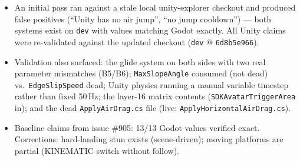 \documentclass[11pt]{article}
\newcommand{\code}[1]{\texttt{\small #1}}
\begin{document}
\begin{itemize}[leftmargin=1.4em]
  \item An initial pass ran against a stale local unity-explorer checkout and produced
        false positives (``Unity has no air jump'', ``no jump cooldown'') --- both
        systems exist on \code{dev} with values matching Godot exactly. All Unity
        claims were re-validated against the updated checkout (\code{dev} @
        \code{6d8b5e966}).
  \item Validation also surfaced: the glide system on both sides with two real
        parameter mismatches (B5/B6); \code{MaxSlopeAngle} consumed (not dead) vs.\
        \code{EdgeSlipSpeed} dead; Unity physics running a manual variable timestep
        rather than fixed 50\,Hz; the layer-16 matrix contents
        (\code{SDKAvatarTriggerArea} in); and the dead \code{ApplyAirDrag.cs} file
        (live: \code{ApplyHorizontalAirDrag.cs}).
  \item Baseline claims from issue \#905: 13/13 Godot values verified exact.
        Corrections: hard-landing stun exists (scene-driven); moving platforms are
        partial (KINEMATIC switch without follow).
\end{itemize}
\end{document}

